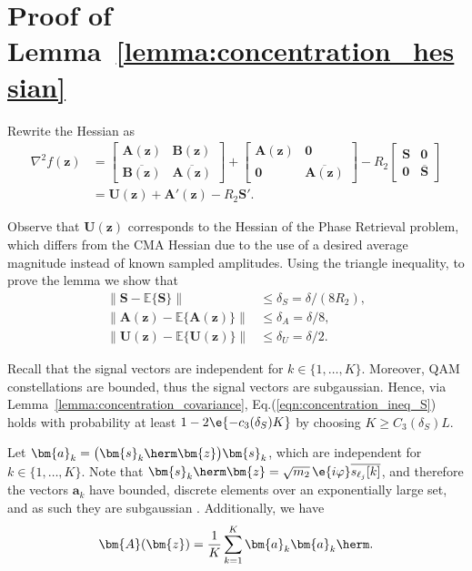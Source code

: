 \section{Proof of Lemma~\ref{lemma:concentration_hessian}}\label{appdx:concentration_hessian}

Rewrite the Hessian as
\begin{align}
	\nabla^2f(\bm{z})&=\begin{bmatrix}
		\bm{A}(\bm{z})&\bm{B}(\bm{z})\\\overline{\bm{B}(\bm{z})}&\overline{\bm{A}(\bm{z})}
	\end{bmatrix}+\begin{bmatrix}
		\bm{A}(\bm{z})&\bm{0}\\\bm{0}&\overline{\bm{A}(\bm{z})}\end{bmatrix}
	-R_2\begin{bmatrix}
		\bm{S}&\bm{0}\\\bm{0}&\overline{\bm{S}}\end{bmatrix}\nonumber\\
	&=\bm{U}(\bm{z})+\bm{A}'(\bm{z})-R_2\bm{S}'.\nonumber
\end{align}

Observe that $\bm{U}(\bm{z})$ corresponds to the Hessian of the Phase Retrieval problem, which differs from the CMA Hessian due to the use of a desired average magnitude instead of known sampled amplitudes. Using the triangle inequality, to prove the lemma we show that
\begin{align}
	\big\|\bm{S}-\mathbb{E}\{\bm{S}\}\big\|&\leq \delta_S={\delta}/{(8R_2)}, \label{eqn:concentration_ineq_S}\\
	\big\|\bm{A}(\bm{z})-\mathbb{E}\{\bm{A}(\bm{z})\}\big\|&\leq \delta_A={\delta}/{8}, \label{eqn:concentration_ineq_A}\\
	\|\bm{U}(\bm{z})-\mathbb{E}\{\bm{U}(\bm{z})\}\|&\leq 
	\delta_U={\delta}/{2}. \label{eqn:concentration_ineq_U}
\end{align}

Recall that the signal vectors are independent for $k\in\{1,\ldots,K\}$. Moreover, QAM constellations are bounded, thus the signal vectors are subgaussian. Hence, via Lemma~\ref{lemma:concentration_covariance},  Eq.(\ref{eqn:concentration_ineq_S}) holds with probability at least $1-2\e{-c_3(\delta_S)K}$ by choosing $K\geq C_3(\delta_S)L$.

Let $\bm{a}_k= \big(\bm{s}_k\herm\bm{z}\big) \bm{s}_k$, which are independent for $k\in\{1,\ldots,K\}$. Note that $\bm{s}_k\herm\bm{z}=\sqrt{m_2}\,\e{i\varphi}\overline{s_{\ell_j}[k]}$, and therefore the vectors $\bm{a}_k$ have bounded, discrete elements over an exponentially large set, and as such they are subgaussian \cite{Vershynin2018hdprobability}. Additionally, we have
\begin{align}
	\bm{A}(\bm{z})= \frac{1}{K}\sum_{k=1}^K \bm{a}_k\bm{a}_k\herm.\nonumber
\end{align}

